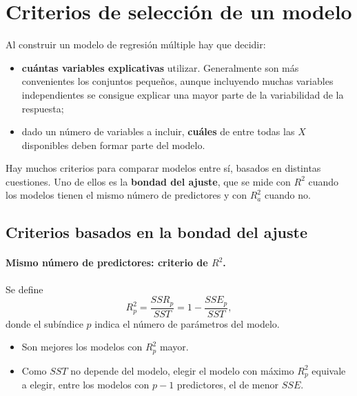 \section{Criterios de selección de un modelo}
\label{sec:t6-seleccion}

Al construir un modelo de regresión múltiple hay que decidir:
\begin{itemize}
  \item \textbf{cuántas variables explicativas} utilizar. Generalmente son más convenientes los
    conjuntos pequeños, aunque incluyendo muchas variables independientes se consigue explicar
    una mayor parte de la variabilidad de la respuesta;
  \item dado un número de variables a incluir, \textbf{cuáles} de entre todas las $X$ disponibles
    deben formar parte del modelo.
\end{itemize}
Hay muchos criterios para comparar modelos entre sí, basados en distintas cuestiones. Uno de ellos
es la \textbf{bondad del ajuste}, que se mide con $R^2$ cuando los modelos tienen el mismo número
de predictores y con $R^2_a$ cuando no.

\subsection{Criterios basados en la bondad del ajuste}

\paragraph{Mismo número de predictores: criterio de $R^2$.} Se define
\[
  R^2_p = \frac{SSR_p}{SST} = 1-\frac{SSE_p}{SST},
\]
donde el subíndice $p$ indica el número de parámetros del modelo.
\begin{itemize}
  \item Son mejores los modelos con $R^2_p$ mayor.
  \item Como $SST$ no depende del modelo, elegir el modelo con máximo $R^2_p$ equivale a elegir,
    entre los modelos con $p-1$ predictores, el de menor $SSE$.
\end{itemize}


